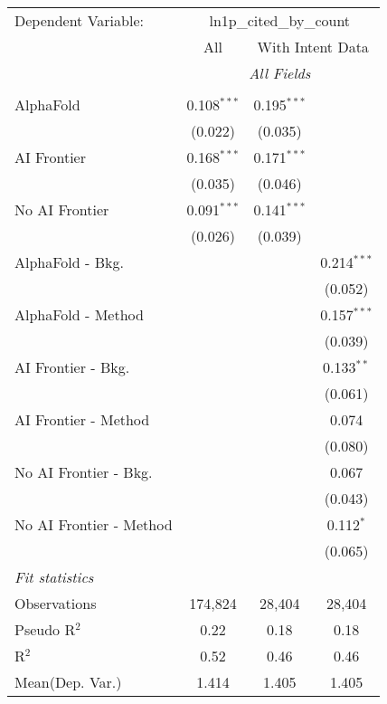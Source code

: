 \begingroup
\centering
\begin{tabular}{lccc}
   \tabularnewline \midrule \midrule
   Dependent Variable: & \multicolumn{3}{c}{ln1p\_cited\_by\_count}\\
 & \multicolumn{1}{c}{All} & \multicolumn{2}{c}{With Intent Data} \\
\cmidrule(lr){2-2} \cmidrule(lr){3-4}
 & \multicolumn{3}{c}{\textit{All Fields}} \\ \\
   AlphaFold               & 0.108$^{***}$ & 0.195$^{***}$ &   \\   
                           & (0.022)       & (0.035)       &   \\   
   AI Frontier             & 0.168$^{***}$ & 0.171$^{***}$ &   \\   
                           & (0.035)       & (0.046)       &   \\   
   No AI Frontier          & 0.091$^{***}$ & 0.141$^{***}$ &   \\   
                           & (0.026)       & (0.039)       &   \\   
   AlphaFold - Bkg.        &               &               & 0.214$^{***}$\\   
                           &               &               & (0.052)\\   
   AlphaFold - Method      &               &               & 0.157$^{***}$\\   
                           &               &               & (0.039)\\   
   AI Frontier - Bkg.      &               &               & 0.133$^{**}$\\   
                           &               &               & (0.061)\\   
   AI Frontier - Method    &               &               & 0.074\\   
                           &               &               & (0.080)\\   
   No AI Frontier - Bkg.   &               &               & 0.067\\   
                           &               &               & (0.043)\\   
   No AI Frontier - Method &               &               & 0.112$^{*}$\\   
                           &               &               & (0.065)\\   
   \midrule
   \emph{Fit statistics}\\
   Observations            & 174,824       & 28,404        & 28,404\\  
   Pseudo R$^2$            & 0.22          & 0.18          & 0.18\\  
   R$^2$                   & 0.52          & 0.46          & 0.46\\  
Mean(Dep. Var.) & 1.414 & 1.405 & 1.405 \\
   

\end{tabular}
